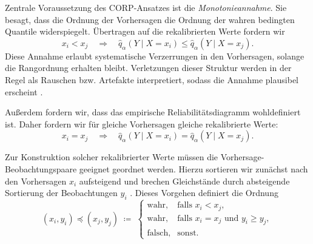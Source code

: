 Zentrale Voraussetzung des CORP-Ansatzes ist die \emph{Monotonieannahme}. Sie besagt, dass die Ordnung der Vorhersagen die Ordnung der wahren bedingten Quantile widerspiegelt. Übertragen auf die rekalibrierten Werte fordern wir
\begin{equation}\label{eq:isotone_asump}
 x_i < x_j \quad \Rightarrow \quad  \hat q_\alpha(Y \mid X=x_i) \leq \hat q_\alpha(Y \mid X=x_j).   
\end{equation}
Diese Annahme erlaubt systematische Verzerrungen in den Vorhersagen, solange die Rangordnung erhalten bleibt. Verletzungen dieser Struktur werden in der Regel als Rauschen bzw. Artefakte interpretiert, sodass die Annahme plausibel erscheint \parencite{gneiting2023regression}.

Außerdem fordern wir, dass das empirische Reliabilitätsdiagramm wohldefiniert ist. Daher fordern wir für gleiche Vorhersagen gleiche rekalibrierte Werte:
\[
x_i = x_j \quad \Rightarrow \quad \hat q_\alpha(Y \mid X=x_i) = \hat q_\alpha(Y \mid X=x_j).
\]

Zur Konstruktion solcher rekalibrierter Werte müssen die Vorhersage-Beobachtungspaare geeignet geordnet werden. Hierzu sortieren wir zunächst nach den Vorhersagen $x_i$ aufsteigend und brechen Gleichstände durch absteigende Sortierung der Beobachtungen $y_i$ \parencite[vgl.][]{gneiting2023supp}. Dieses Vorgehen definiert die Ordnung
\begin{equation}\label{eq:pav_order}
(x_i,y_i) \preceq (x_j,y_j)
\;\coloneqq\;
\begin{cases}
\text{wahr}, & \text{falls } x_i < x_j,\\[0.3em]
\text{wahr}, & \text{falls } x_i = x_j \text{ und } y_i \ge y_j,\\[0.3em]
\text{falsch}, & \text{sonst}.
\end{cases}
\end{equation}{}

